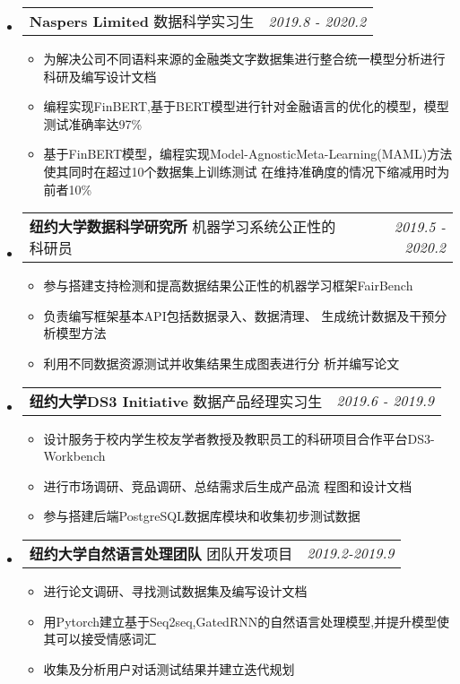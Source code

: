 \documentclass[letterpaper,10pt]{article}
\makeatletter
\newcommand{\resitem}[1]{\item #1 \vspace{-3.5pt}}
\newcommand{\ressubheading}[4]{
\begin{tabular*}{7.0in}{l@{\extracolsep{\fill}}r}
		\textbf{#1} \textit{#2}#3 & \textit{#4} \\
\end{tabular*}\vspace{-6pt}}
\makeatother
\begin{document}
\begin{itemize}
    \item\ressubheading{Naspers Limited}{}{数据科学实习生}{2019.8 - 2020.2}
	\begin{itemize}
\setlength\itemsep{0em}
	    \resitem{为解决公司不同语料来源的金融类文字数据集进行整合统一模型分析进行科研及编写设计文档}
		\resitem{编程实现FinBERT,基于BERT模型进行针对金融语言的优化的模型，模型测试准确率达97\%}
		\resitem{基于FinBERT模型，编程实现Model-AgnosticMeta-Learning(MAML)方法使其同时在超过10个数据集上训练测试 在维持准确度的情况下缩减用时为前者10\%}
	\end{itemize}

\item
	\ressubheading{纽约大学数据科学研究所}{}{机器学习系统公正性的科研员}{2019.5 - 2020.2}
	\begin{itemize}
		\resitem{参与搭建支持检测和提高数据结果公正性的机器学习框架FairBench}
		\resitem{负责编写框架基本API包括数据录入、数据清理、 生成统计数据及干预分析模型方法}
		\resitem{利用不同数据资源测试并收集结果生成图表进行分 析并编写论文}
	\end{itemize}

\item
	\ressubheading{纽约大学DS3 Initiative}{}{数据产品经理实习生}{2019.6 - 2019.9}
	\begin{itemize}
	\setlength\itemsep{0.05em}
		\resitem{设计服务于校内学生校友学者教授及教职员工的科研项目合作平台DS3-Workbench}
		\resitem{进行市场调研、竞品调研、总结需求后生成产品流 程图和设计文档}
		\resitem{参与搭建后端PostgreSQL数据库模块和收集初步测试数据}
	\end{itemize}

\item
	\ressubheading{纽约大学自然语言处理团队}{}{团队开发项目}{2019.2-2019.9}
	\begin{itemize}
	\setlength\itemsep{0.05em}
		\resitem{进行论文调研、寻找测试数据集及编写设计文档}
		\resitem{用Pytorch建立基于Seq2seq,GatedRNN的自然语言处理模型,并提升模型使其可以接受情感词汇}
		\resitem{收集及分析用户对话测试结果并建立迭代规划}
	\end{itemize}
	
	

\end{itemize}
\end{document}
